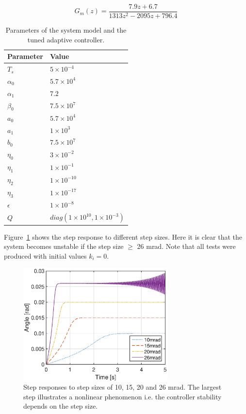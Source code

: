 \begin{equation}
  \label{eq:sys_gm}
  G_m(z) = \frac{7.9z + 6.7}{1313z^{2} - 2095z + 796.4}
\end{equation}

\begin{table}[h!]
  \centering
  \begin{tabular}{| l | l |}
    \hline
    Parameter & Value \\ \hline
    $T_s$ & $5 \times 10^{-4}$ \\
    $\alpha_0$ & $5.7 \times 10^{4}$ \\
    $\alpha_1$ & $7.2$ \\
    $\beta_0$ & $7.5 \times 10^{7}$ \\
    $a_0$ & $5.7 \times 10^{4}$ \\
    $a_1$ & $1 \times 10^{3}$ \\
    $b_0$ & $7.5 \times 10^{7}$ \\
    $\eta_0$ & $3 \times 10^{-2}$ \\
    $\eta_1$ & $1 \times 10^{-1}$ \\
    $\eta_2$ & $1 \times 10^{-10}$ \\
    $\eta_3$ & $1 \times 10^{-17}$ \\
    $\epsilon$ & $1 \times 10^{-8}$ \\
    $Q$ & $diag(1 \times 10^{10}, 1 \times 10^{-3})$\\
    \hline
  \end{tabular}
  \caption{\label{tab:adaptive_param} Parameters of the system model and the tuned adaptive controller.}
\end{table}

Figure~\ref{fig:step_adaptive} shows the step response to different step sizes. Here it is clear that the system becomes unstable if the step size $\geq$ 26 mrad. Note that all tests were produced with initial values $k_i = 0$.

\begin{figure}[h!]
  \centering
  \includegraphics[width=0.7\textwidth]{fig/matlab/stepresponse.eps}
  \caption{\label{fig:step_adaptive} Step responses to step sizes of 10, 15, 20 and 26 mrad. The largest step illustrates a nonlinear phenomenon i.e. the controller stability depends on the step size.}
\end{figure}

